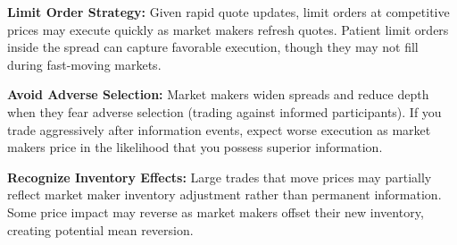 \textbf{Limit Order Strategy:} Given rapid quote updates, limit orders at competitive prices may execute quickly as market makers refresh quotes. Patient limit orders inside the spread can capture favorable execution, though they may not fill during fast-moving markets.

\textbf{Avoid Adverse Selection:} Market makers widen spreads and reduce depth when they fear adverse selection (trading against informed participants). If you trade aggressively after information events, expect worse execution as market makers price in the likelihood that you possess superior information.

\textbf{Recognize Inventory Effects:} Large trades that move prices may partially reflect market maker inventory adjustment rather than permanent information. Some price impact may reverse as market makers offset their new inventory, creating potential mean reversion.
